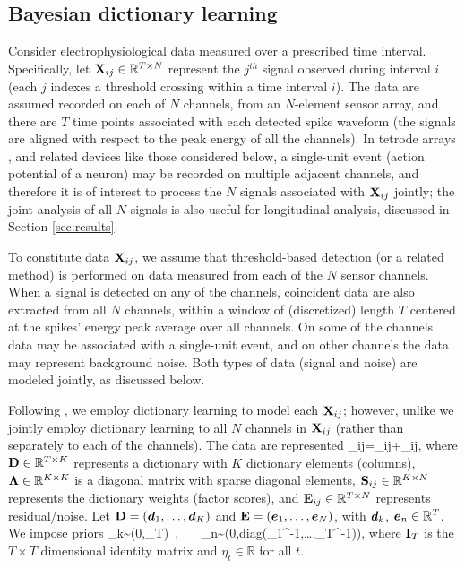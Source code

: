 \documentclass[journal]{IEEEtran}
\newcommand{\Real}{\mathbb{R}}
\begin{document}

\subsection{Bayesian dictionary learning\label{sec:dict}}

Consider electrophysiological data measured over a prescribed time interval. Specifically, let ${\mathbf X}_{ij}\in\mathbb{R}^{T\times N}$ represent the $j${$^{th}$} signal observed during interval $i$ {(each $j$ indexes a threshold crossing within a time interval $i$)}. The data are assumed recorded on each of $N$ channels, from an $N$-element sensor array, and there are $T$ time points associated with each detected spike waveform (the signals are aligned with respect to the peak energy of all the channels). In tetrode arrays \cite{tetrode}, and related devices like those considered below, a single-unit event (action potential of a neuron) may be recorded on multiple adjacent channels, and therefore it is of interest to process the $N$ signals associated with ${\mathbf X}_{ij}$ jointly; the joint analysis of all $N$ signals is also useful for {longitudinal analysis}, discussed in Section \ref{sec:results}.

To constitute data ${\mathbf X}_{ij}$, {we assume} that threshold-based detection (or a related method) is performed on data measured from each of the $N$ sensor channels. When a signal is detected on any of the channels, coincident data are also extracted from all $N$ channels, within a window of (discretized) length $T$ {centered at the spikes' energy peak average over all channels}. On some of the channels data may be associated with a single-unit event, and on other channels the data may represent background noise. Both types of data (signal and noise) are modeled jointly, as discussed below.

Following \cite{Bo2011}, we employ dictionary learning to model each ${\mathbf X}_{ij}$; however, unlike \cite{Bo2011} we jointly employ dictionary learning to all $N$ channels in ${\mathbf X}_{ij}$ (rather than separately to each of the channels). The data are represented
\beq\Xmat_{ij}=\Dmat \Lambdamat \Smat_{ij}+\Emat_{ij},\label{eq:basic}\eeq
where ${\mathbf D}\in\mathbb{R}^{T\times K}$ represents a dictionary with $K$ dictionary elements (columns), $\boldsymbol{\Lambda}\in\mathbb{R}^{K\times K}$ is a diagonal matrix with sparse diagonal elements, ${\mathbf S}_{ij}\in\mathbb{R}^{K\times N}$ represents the dictionary weights (factor scores), and ${\mathbf E}_{ij}\in\mathbb{R}^{T\times N}$ represents residual/noise. Let ${\mathbf D}=(\boldsymbol{d}_1,\dots,\boldsymbol{d}_K)$ and ${\mathbf E}=(\boldsymbol{e}_1,\dots,\boldsymbol{e}_N)$, with {$\boldsymbol{d}_k$, $\boldsymbol{e}_n\in\mathbb{R}^T$}. We impose priors
\beq \dv_k\sim{}(0,\Imat_T)~,~~~ \ev_n\sim{}(0,\mbox{diag}(\eta_1^{-1},\dots,\eta_T^{-1})),\eeq
where ${\mathbf I}_T$ is the $T\times T$ dimensional identity matrix {and $\eta_t \in \Real$ for all $t$}.
\end{document}
